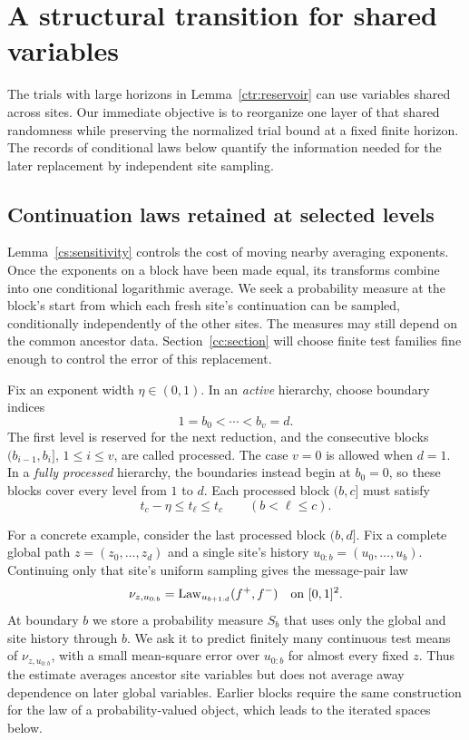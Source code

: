 \section{A structural transition for shared variables}\label{ct:section}

The trials with large horizons in Lemma~\ref{ctr:reservoir} can use variables
shared across sites.  Our immediate objective is to reorganize one layer
of that shared randomness while preserving the normalized trial bound at
a fixed finite horizon.  The records of conditional laws below quantify the
information needed for the later replacement by independent site
sampling.

\subsection{Continuation laws retained at selected levels}

Lemma~\ref{cs:sensitivity} controls the cost of moving nearby averaging
exponents. Once the exponents on a block have been made equal, its
transforms combine into one conditional logarithmic average. We seek a
probability measure at the block's start from which each fresh site's
continuation can be sampled, conditionally independently of the other
sites. The measures may still depend on the common ancestor data.
Section~\ref{cc:section} will choose finite test families fine enough to
control the error of this replacement.

Fix an exponent width $\eta\in(0,1)$. In an \emph{active} hierarchy,
choose boundary indices
\[
 1=b_0<\cdots<b_v=d.
\]
The first level is reserved for the next reduction, and the consecutive
blocks $(b_{i-1},b_i]$, $1\le i\le v$, are called processed. The case
$v=0$ is allowed when $d=1$. In a \emph{fully processed} hierarchy,
the boundaries instead begin at $b_0=0$, so these blocks cover every
level from $1$ to $d$. Each processed block $(b,c]$ must satisfy
\begin{equation}
 t_c-\eta\le t_\ell\le t_c\qquad(b<\ell\le c).
 \label{ctr:band}
\end{equation}

For a concrete example, consider the last processed block $(b,d]$.
Fix a complete global path $z=(z_0,\ldots,z_d)$ and a single site's
history $u_{0:b}=(u_0,\ldots,u_b)$. Continuing only that site's uniform
sampling gives the message-pair law
\[
 \nu_{z,u_{0:b}}
   =\operatorname{Law}_{u_{b+1:d}}(f^+,f^-)
       \quad\hbox{on }[0,1]^2.
\]
At boundary $b$ we store a probability measure $S_b$ that uses only the
global and site history through $b$. We ask it to predict finitely many
continuous test means of $\nu_{z,u_{0:b}}$, with a small mean-square error
over $u_{0:b}$ for almost every fixed $z$. Thus the estimate averages
ancestor site variables but does not average away dependence on later
global variables. Earlier blocks require the same construction for the
law of a probability-valued object, which leads to the iterated spaces
below.


